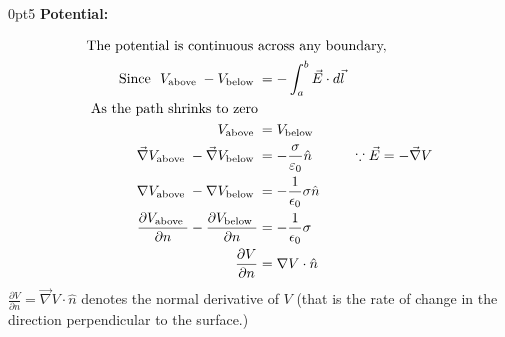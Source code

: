 \opencutright
\renewcommand\windowpagestuff{
	\centering\texttt{[image: e boundary2]}}
\begin{cutout}{0}{\dimexpr\linewidth-3.5cm\relax}{0pt}{5}
	\textbf{Potential:}
	
	\begin{align}
	\text{The potential is continuous }&\text{across any boundary, }\notag\\
	\text{Since }\ V_{\text {above }}-V_{\text {below }}&=-\int_{a}^{b} \vec{E} \cdot d \vec{l}\notag\\
	\text{As the path shrinks to zero}\notag\\
	V_{\text {above }}&=V_{\text {below }} \notag\\
	\vec{\nabla} V_{\text {above }}-\vec{\nabla} V_{\text {below }}&=-\frac{\sigma}{\varepsilon_{0}} \hat{n}\hspace{1cm} \because\vec{E}=-\vec{\nabla} V \\
	\nabla V_{\text {above }}-\nabla V_{\text {below }}&=-\frac{1}{\epsilon_{0}} \sigma \hat{n} \notag \\
	\frac{\partial V_{\text {above }}}{\partial n}-\frac{\partial V_{\text {below }}}{\partial n}&=-\frac{1}{\epsilon_{0}} \sigma \notag\\
	\frac{\partial V}{\partial n}&=\nabla V \cdot \hat{{n}}
	\end{align}
	$\frac{\partial V}{\partial n}=\vec{\nabla} V \cdot \hat{n}$ denotes the normal derivative of $V$ (that is the rate of change in the direction perpendicular to the surface.)
\end{cutout}

\begin{center}
\end{center}








